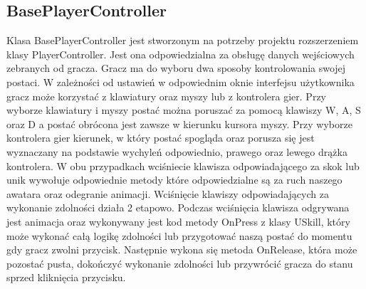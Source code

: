 \documentclass[multip]{SGGW-thesis}
\begin{document}
	\subsection{BasePlayerController}
	Klasa BasePlayerController jest stworzonym na potrzeby projektu rozszerzeniem klasy PlayerController. Jest ona odpowiedzialna za obsługę danych wejściowych zebranych od gracza. 
Gracz ma do wyboru dwa sposoby kontrolowania swojej postaci. W zależności od ustawień w odpowiednim oknie interfejsu użytkownika gracz może korzystać z klawiatury oraz myszy lub z kontrolera gier. Przy wyborze klawiatury i myszy postać można poruszać za pomocą klawiszy W, A, S oraz D a postać obrócona jest zawsze w kierunku kursora myszy.  Przy wyborze kontrolera gier kierunek, w który postać spogląda oraz porusza się jest wyznaczany na podstawie wychyleń odpowiednio, prawego oraz lewego drążka kontrolera. W obu przypadkach wciśniecie klawisza odpowiadającego za skok lub unik wywołuje odpowiednie metody które odpowiedzialne są za ruch naszego awatara oraz odegranie animacji. Wciśnięcie klawiszy odpowiadających za wykonanie zdolności działa 2 etapowo. Podczas wciśnięcia klawisza odgrywana jest animacja oraz wykonywany jest kod metody OnPress z klasy USkill, który może wykonać całą logikę zdolności lub przygotować naszą postać do momentu gdy gracz zwolni przycisk. Następnie wykona się metoda OnRelease, która może pozostać pusta, dokończyć wykonanie zdolności lub przywrócić gracza do stanu sprzed kliknięcia przycisku.
\end{document}
